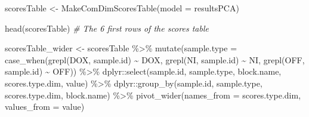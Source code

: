 \documentclass[
]{book}
\newenvironment{Shaded}{\begin{snugshade}}{\end{snugshade}}
\newcommand{\AttributeTok}[1]{\textcolor[rgb]{0.77,0.63,0.00}{#1}}
\newcommand{\CommentTok}[1]{\textcolor[rgb]{0.56,0.35,0.01}{\textit{#1}}}
\newcommand{\FunctionTok}[1]{\textcolor[rgb]{0.00,0.00,0.00}{#1}}
\newcommand{\NormalTok}[1]{#1}
\newcommand{\OtherTok}[1]{\textcolor[rgb]{0.56,0.35,0.01}{#1}}
\newcommand{\SpecialCharTok}[1]{\textcolor[rgb]{0.00,0.00,0.00}{#1}}
\newcommand{\StringTok}[1]{\textcolor[rgb]{0.31,0.60,0.02}{#1}}
\begin{document}
\begin{Shaded}
\begin{Highlighting}[]
\NormalTok{scoresTable }\OtherTok{\textless{}{-}} \FunctionTok{MakeComDimScoresTable}\NormalTok{(}\AttributeTok{model =}\NormalTok{ resultsPCA)}

\FunctionTok{head}\NormalTok{(scoresTable) }\CommentTok{\# The 6 first rows of the scores table}

\NormalTok{scoresTable\_wider }\OtherTok{\textless{}{-}}\NormalTok{ scoresTable }\SpecialCharTok{\%\textgreater{}\%}
  \FunctionTok{mutate}\NormalTok{(}\AttributeTok{sample.type =} \FunctionTok{case\_when}\NormalTok{(}\FunctionTok{grepl}\NormalTok{(}\StringTok{\textquotesingle{}DOX\textquotesingle{}}\NormalTok{, sample.id) }\SpecialCharTok{\textasciitilde{}} \StringTok{\textquotesingle{}DOX\textquotesingle{}}\NormalTok{,}
                                 \FunctionTok{grepl}\NormalTok{(}\StringTok{\textquotesingle{}NI\textquotesingle{}}\NormalTok{, sample.id) }\SpecialCharTok{\textasciitilde{}} \StringTok{\textquotesingle{}NI\textquotesingle{}}\NormalTok{,}
                                 \FunctionTok{grepl}\NormalTok{(}\StringTok{\textquotesingle{}OFF\textquotesingle{}}\NormalTok{, sample.id) }\SpecialCharTok{\textasciitilde{}} \StringTok{\textquotesingle{}OFF\textquotesingle{}}\NormalTok{)) }\SpecialCharTok{\%\textgreater{}\%}
\NormalTok{  dplyr}\SpecialCharTok{::}\FunctionTok{select}\NormalTok{(sample.id, sample.type, block.name, scores.type.dim, value) }\SpecialCharTok{\%\textgreater{}\%}
\NormalTok{  dplyr}\SpecialCharTok{::}\FunctionTok{group\_by}\NormalTok{(sample.id, sample.type, scores.type.dim, block.name) }\SpecialCharTok{\%\textgreater{}\%}
  \FunctionTok{pivot\_wider}\NormalTok{(}\AttributeTok{names\_from =}\NormalTok{ scores.type.dim, }\AttributeTok{values\_from =}\NormalTok{ value)}


\end{Highlighting}
\end{Shaded}
\end{document}
